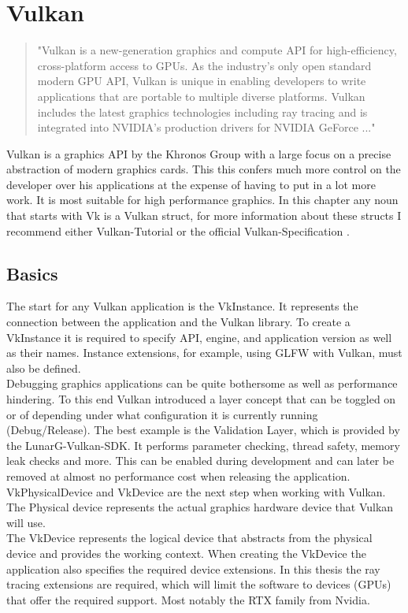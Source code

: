 \section{Vulkan}
\label{sec:Vulkan}
\begin{quote}
    "Vulkan is a new-generation graphics and compute API for high-efficiency, cross-platform access to GPUs. As the industry’s only open standard modern GPU API, Vulkan is unique in enabling developers to write applications that are portable to multiple diverse platforms. Vulkan includes the latest graphics technologies including ray tracing and is integrated into NVIDIA’s production drivers for NVIDIA GeForce ..."\cite{vulkanNvidia}
\end{quote}
Vulkan is a graphics API by the Khronos Group with a large focus on a precise abstraction of modern graphics cards. This this confers much more control on the developer over his applications at the expense of having to put in a lot more work. It is most suitable for high performance graphics. In this chapter any noun that starts with Vk is a Vulkan struct, for more information about these structs I recommend either Vulkan-Tutorial \cite{vulkanTutorial} or the official Vulkan-Specification \cite{vulkanSpec}.
\subsection{Basics}
\label{sec:VkBasics}
The start for any Vulkan application is the VkInstance. It represents the connection between the application and the Vulkan library. To create a VkInstance it is required to specify API, engine, and application version as well as their names. Instance extensions, for example, using GLFW with Vulkan, must also be defined.\\
Debugging graphics applications can be quite bothersome as well as performance hindering. To this end Vulkan introduced a layer concept that can be toggled on or of depending under what configuration it is currently running (Debug/Release). The best example is the Validation Layer, which is provided by the LunarG-Vulkan-SDK. It performs parameter checking, thread safety, memory leak checks and more. This can be enabled during development and can later be removed at almost no performance cost when releasing the application.\\
VkPhysicalDevice and VkDevice are the next step when working with Vulkan. The Physical device represents the actual graphics hardware device that Vulkan will use.\\
The VkDevice represents the logical device that abstracts from the physical device and provides the working context. When creating the VkDevice the application also specifies the required device extensions. In this thesis the ray tracing extensions are required, which will limit the software to devices (GPUs) that offer the required support. Most notably the RTX family from Nvidia.
